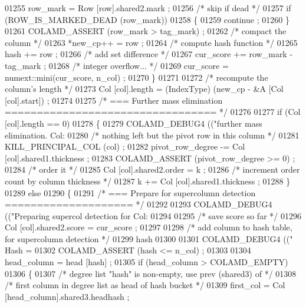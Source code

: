 \begin{DoxyCode}
{{{{{{{{{{{{{{{{{{{{{{{{{01255     row\_mark = Row [row].shared2.mark ;
01256     \textcolor{comment}{/* skip if dead */}
01257     \textcolor{keywordflow}{if} (ROW\_IS\_MARKED\_DEAD (row\_mark))
01258     \{
01259       continue ;
01260     \}
01261     COLAMD\_ASSERT (row\_mark > tag\_mark) ;
01262     \textcolor{comment}{/* compact the column */}
01263     *new\_cp++ = row ;
01264     \textcolor{comment}{/* compute hash function */}
01265     hash += row ;
01266     \textcolor{comment}{/* add set difference */}
01267     cur\_score += row\_mark - tag\_mark ;
01268     \textcolor{comment}{/* integer overflow... */}
01269     cur\_score = numext::mini(cur\_score, n\_col) ;
01270       \}
01271 
01272       \textcolor{comment}{/* recompute the column's length */}
01273       Col [col].length = (IndexType) (new\_cp - &A [Col [col].start]) ;
01274 
01275       \textcolor{comment}{/* === Further mass elimination ================================= */}
01276 
01277       \textcolor{keywordflow}{if} (Col [col].length == 0)
01278       \{
01279     COLAMD\_DEBUG4 ((\textcolor{stringliteral}{"further mass elimination. Col: %
01280     \textcolor{comment}{/* nothing left but the pivot row in this column */}
01281     KILL\_PRINCIPAL\_COL (col) ;
01282     pivot\_row\_degree -= Col [col].shared1.thickness ;
01283     COLAMD\_ASSERT (pivot\_row\_degree >= 0) ;
01284     \textcolor{comment}{/* order it */}
01285     Col [col].shared2.order = k ;
01286     \textcolor{comment}{/* increment order count by column thickness */}
01287     k += Col [col].shared1.thickness ;
01288       \}
01289       \textcolor{keywordflow}{else}
01290       \{
01291     \textcolor{comment}{/* === Prepare for supercolumn detection ==================== */}
01292 
01293     COLAMD\_DEBUG4 ((\textcolor{stringliteral}{"Preparing supercol detection for Col: %
01294 
01295     \textcolor{comment}{/* save score so far */}
01296     Col [col].shared2.score = cur\_score ;
01297 
01298     \textcolor{comment}{/* add column to hash table, for supercolumn detection */}
01299     hash %
01300 
01301     COLAMD\_DEBUG4 ((\textcolor{stringliteral}{" Hash = %
01302     COLAMD\_ASSERT (hash <= n\_col) ;
01303 
01304     head\_column = head [hash] ;
01305     \textcolor{keywordflow}{if} (head\_column > COLAMD\_EMPTY)
01306     \{
01307       \textcolor{comment}{/* degree list "hash" is non-empty, use prev (shared3) of */}
01308       \textcolor{comment}{/* first column in degree list as head of hash bucket */}
01309       first\_col = Col [head\_column].shared3.headhash ;
}}}}}}}}}}}}}}}}}}}}}}}}}}}}
\end{DoxyCode}
